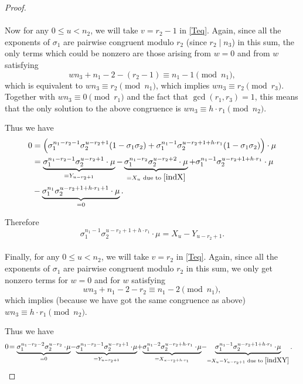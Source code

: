\begin{proof}
\paragraph*{}
Now for any $0\leq u< n_2$, we will take $v=r_2-1$ in \eqref{Teq}. Again, since all the exponents of $\sigma_1$ are pairwise congruent modulo $r_2$ (since $r_2\mid n_3$) in this sum, the only terms which could be nonzero are those arising from $w=0$ and from $w$ satisfying
$$wn_3+n_1-2-(r_2-1)\equiv n_1-1 \pmod{n_1},$$
which is equivalent to $wn_3\equiv r_2\pmod{n_1}$, which implies $wn_3\equiv r_2\pmod{r_3}$. Together with $wn_3\equiv 0\pmod{r_1}$ and the fact that $\gcd(r_1,r_3)=1$, this means that the only solution to the above congruence is $wn_3\equiv h\cdot r_1\pmod{n_2}$.

Thus we have 
\begin{align*}
0&=\left(\sigma_1^{n_1-r_2-1}\sigma_2^{u-r_2+1}(1-\sigma_1\sigma_2)+\sigma_1^{n_1-1}\sigma_2^{u-r_2+1+h\cdot r_1}(1-\sigma_1\sigma_2)\right)\cdot \mu\\
&=\underbrace{\sigma_1^{n_1-r_2-1}\sigma_2^{u-r_2+1}\cdot\mu}_{=Y_{u-r_2+1}}-\underbrace{\sigma_1^{n_1-r_2}\sigma_2^{u-r_2+2}\cdot\mu}_{=X_u \text{ due to } \eqref{indX}}+\sigma_1^{n_1-1}\sigma_2^{u-r_2+1+h\cdot r_1}\cdot \mu\\
&-\underbrace{\sigma_1^{n_1}\sigma_2^{u-r_2+1+h\cdot r_1+1}\cdot \mu}_{=0}.
\end{align*}

Therefore
\begin{equation}\label{indXY}
\sigma_1^{n_1-1}\sigma_2^{u-r_2+1+h\cdot r_1}\cdot \mu = X_u -Y_{u-r_2+1}.
\end{equation}

\paragraph*{}
Finally, for any $0\leq u< n_2$, we will take $v=r_2$ in \eqref{Teq}. Again, since all the exponents of $\sigma_1$ are pairwise congruent modulo $r_2$ in this sum, we only get nonzero terms for $w=0$ and for $w$ satisfying
$$wn_3+n_1-2-r_2\equiv n_1-2 \pmod{n_1},$$ which implies (because we have got the same congruence as above) $wn_3\equiv h\cdot r_1\pmod{n_2}$.

Thus we have 
\begin{align*}
0&\!=\underbrace{\sigma_1^{n_1-r_2-2}\sigma_2^{u-r_2}\cdot\!\mu}_{=0}\!-\!\underbrace{\sigma_1^{n_1-r_2-1}\sigma_2^{u-r_2+1}\cdot\!\mu}_{=Y_{u-r_2+1}}
\!+\!\underbrace{\sigma_1^{n_1-2}\sigma_2^{u-r_2+h\cdot r_1}\cdot \!\mu}_{=X_{u-r_2+h\cdot r_1}}\!-\!\underbrace{\sigma_1^{n_1-1}\sigma_2^{u-r_2+1+h\cdot r_1}\cdot \!\mu}_{=X_u-Y_{u-r_2+1} \text{ due to } \eqref{indXY}}.
\end{align*}


\end{proof}
